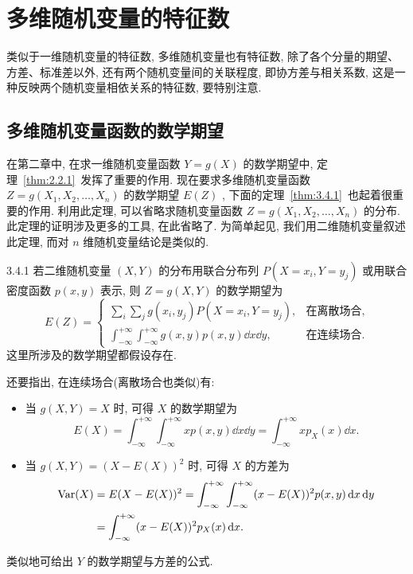   \section{多维随机变量的特征数}\label{sec:3.4}
  类似于一维随机变量的特征数, 多维随机变量也有特征数, 除了各个分量的期望、方差、标准差以外, 还有两个随机变量间的关联程度, 即协方差与相关系数, 这是一种反映两个随机变量相依关系的特征数, 要特别注意.
  \subsection{多维随机变量函数的数学期望}\label{ssec:3.4.1}
  在第二章中, 在求一维随机变量函数 $Y=g(X)$ 的数学期望中, 定理~\ref{thm:2.2.1}~发挥了重要的作用. 现在要求多维随机变量函数 $Z=g(X_1,X_2,\ldots,X_n)$ 的数学期望 $E(Z)$ , 下面的定理~\ref{thm:3.4.1}~也起着很重要的作用. 利用此定理, 可以省略求随机变量函数 $Z=g(X_1,X_2,\ldots,X_n)$ 的分布. 此定理的证明涉及更多的工具, 在此省略了. 为简单起见, 我们用二维随机变量叙述此定理, 而对 $n$ 维随机变量结论是类似的.
  \begin{theorem}{}{3.4.1}
  	若二维随机变量 $(X,Y)$ 的分布用联合分布列 $P(X=x_i,Y=y_j)$ 或用联合密度函数 $p(x,y)$ 表示, 则 $Z=g(X,Y)$ 的数学期望为
  	\begin{equation}\label{eq:3.4.1}
  		E(Z)=\begin{cases}
  		\sum_{i}\sum_{j}g(x_i,y_j)P(X=x_i,Y=y_j), & \text{在离散场合},\\
  		\int_{-\infty}^{+\infty}\int_{-\infty}^{+\infty}g(x,y)p(x,y)\dd x\dd y, & \text{在连续场合}.
  		\end{cases}
  	\end{equation}
  	这里所涉及的数学期望都假设存在.
  	
  	还要指出, 在连续场合(离散场合也类似)有:
  	\begin{itemize}
  		\item 当 $g(X,Y)=X$ 时, 可得 $X$ 的数学期望为
  		\begin{equation*}
  			E(X)=\int_{-\infty}^{+\infty}\int_{-\infty}^{+\infty}xp(x,y)\dd x\dd y=\int_{-\infty}^{+\infty}xp_{X}(x)\dd x.
  		\end{equation*}
  		\item 当 $g(X,Y)=(X-E(X))^2$ 时, 可得 $X$ 的方差为
  		\begin{align*}
  			\operatorname{Var}(X)&=E(X-E(X))^2=\int_{-\infty}^{+\infty}\int_{-\infty}^{+\infty}(x-E(X))^2p(x,y)\mathop{}\!\mathrm d x\mathop{}\!\mathrm d y\\
  			&=\int_{-\infty}^{+\infty}(x-E(X))^2p_{X}(x)\mathop{}\!\mathrm d x.
  		\end{align*}
  	\end{itemize}

    类似地可给出 $Y$ 的数学期望与方差的公式.
  \end{theorem}
